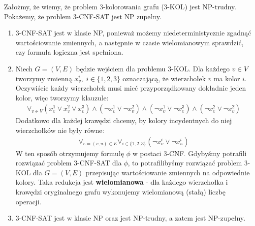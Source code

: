 \begin{example}
    Założmy, że wiemy, że problem 3-kolorowania grafu (3-KOL) jest NP-trudny. Pokażemy, że problem 3-CNF-SAT jest NP zupełny.
    \begin{enumerate}
        \item 3-CNF-SAT jest w klasie NP, ponieważ możemy niedeterministycznie zgadnąć wartościowanie zmiennych, a następnie w czasie wielomianowym sprawdzić, czy formuła logiczna jest spełniona.
        \item Niech $G = (V, E)$ będzie wejściem dla problemu 3-KOL. Dla każdego $v \in V$ tworzymy zmienną $x_v^i, \; i \in \{1, 2, 3\}$ oznaczającą, że wierzchołek $v$ ma kolor $i$. Oczywiście każdy wierzchołek musi mieć przyporządkowany dokładnie jeden kolor, więc tworzymy klauzule:
        \begin{align*}
            \forall_{v \in V} (x_v^1 \lor x_v^2 \lor x_v^3) \land (\neg x_v^1 \lor \neg x_v^2) \land (\neg x_v^1 \lor \neg x_v^3) \land (\neg x_v^2 \lor \neg x_v^2)
        \end{align*}
        Dodatkowo dla każdej krawędzi chcemy, by kolory incydentnych do niej wierzchołków nie były równe:
        \begin{align*}
            \forall_{e = (v, u) \in E} \forall_{i \in \{1, 2, 3\}} (\neg x_v^i \lor \neg x_u^i)
        \end{align*}
        W ten sposób otrzymujemy formułę $\phi$ w postaci 3-CNF. Gdybyśmy potrafili rozwiązać problem 3-CNF-SAT dla $\phi$, to potrafilibyśmy rozwiązać problem 3-KOL dla $G = (V, E)$ przepisując wartościowanie zmiennych na odpowiednie kolory. Taka redukcja jest \textbf{wielomianowa} - dla każdego wierzchołka i krawędzi oryginalnego grafu wykonujemy wielomianową (stałą) liczbę operacji.
        \item 3-CNF-SAT jest w klasie NP oraz jest NP-trudny, a zatem jest NP-zupełny.
    \end{enumerate}
\end{example}


